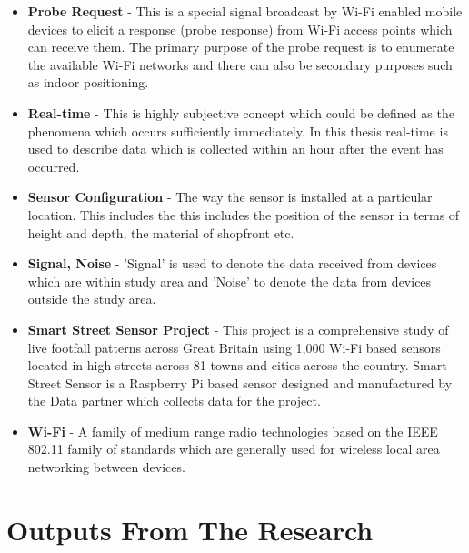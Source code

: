 \begin{itemize}
  \item \textbf{Probe Request} - This is a special signal broadcast by Wi-Fi enabled mobile devices to elicit a response (probe response) from Wi-Fi access points which can receive them. The primary purpose of the probe request is to enumerate the available Wi-Fi networks and there can also be secondary purposes such as indoor positioning.

  \item \textbf{Real-time} - This is highly subjective concept which could be defined as the phenomena which occurs sufficiently immediately. In this thesis real-time is used to describe data which is collected within an hour after the event has occurred.

  \item \textbf{Sensor Configuration} - The way the sensor is installed at a particular location. This includes the this includes the position of the sensor in terms of height and depth, the material of shopfront etc.

  \item \textbf{Signal, Noise} - 'Signal' is used to denote the data received from devices which are within study area and 'Noise' to denote the data from devices outside the study area.

  \item \textbf{Smart Street Sensor Project} - This project is a comprehensive study of live footfall patterns across Great Britain using 1,000 Wi-Fi based sensors located in high streets across 81 towns and cities across the country. Smart Street Sensor is a Raspberry Pi based sensor designed and manufactured by the Data partner which collects data for the project.

  \item \textbf{Wi-Fi} - A family of medium range radio technologies based on the IEEE 802.11 family of standards which are generally used for wireless local area networking between devices.

\end{itemize}


\chapter*{Outputs From The Research} \label{front:outputs}

